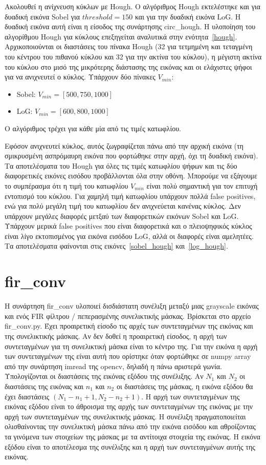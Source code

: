\documentclass{article}
\begin{document}
Ακολουθεί η ανίχνευση κύκλων με Hough. Ο αλγόριθμος Hough εκτελέστηκε και για
δυαδική εικόνα Sobel για $threshold = 150$ και για την δυαδική εικόνα LoG. 
Η δυαδική εικόνα αυτή είναι η είσοδος της συνάρτησης circ\_hough. 
Η υλοποίηση του αλγορίθμου Hough για κύκλους επεξηγείται αναλυτικά στην 
ενότητα~\ref{hough}. 
Αρχικοποιούνται οι διαστάσεις του πίνακα Hough (32 για τετμημένη και τεταγμένη
του κέντρου του πιθανού κύκλου και 32 για την ακτίνα του κύκλου), η μέγιστη 
ακτίνα του κύκλου στο μισό της μικρότερης διάστασης της εικόνας και οι ελάχιστες
ψήφοι για να ανιχνευτεί ο κύκλος. Υπάρχουν δύο πίνακες $V_{min}$:
\begin{itemize}
    \item Sobel: $V_{min} = \left[500, 750, 1000\right]$
    \item LoG: $V_{min} = \left[600, 800, 1000\right]$
\end{itemize}
Ο αλγόριθμος τρέχει για κάθε μία από τις τιμές κατωφλίου.

Εφόσον ανιχνευτεί κύκλος, αυτός ζωγραφίζεται πάνω από την αρχική εικόνα 
(τη σμικρυσμένη ασπρόμαυρη εικόνα που φορτώθηκε στην αρχή, όχι τη δυαδική εικόνα). 
Τα αποτελέσματα του Hough για όλες τις τιμές κατωφλίου ψήφων και τις δύο διαφορετικές
εικόνες εισόδου προβάλλονται όλα στην οθόνη. Μπορούμε να εξάγουμε
το συμπέρασμα ότι η τιμή του κατωφλίου $V_{min}$ είναι πολύ σημαντική για τον
επιτυχή εντοπισμό του κύκλου. Για χαμηλή τιμή κατωφλίου υπάρχουν πολλά false positives,
ενώ για πολύ μεγάλη τιμή του κατωφλίου δεν ανιχνεύεται κανένας κύκλος. Δεν υπάρχουν
μεγάλες διαφορές μετξαύ των διαφορετικών εικόνων Sobel και LoG. Υπάρχουν μερικά
false positives που είναι διαφορετικά και ο πλειοψηφικός κύκλος είναι λίγο εκτοπισμένος
για εικόνα εισόδου LoG, αλλά οι διαφορές είναι αμελητέες. Τα αποτελέσματα φαίνονται στις
εικόνες~\ref{sobel_hough} και~\ref{log_hough}.

\section{fir\_conv}
Η συνάρτηση fir\_conv υλοποιεί δισδιάστατη συνέλιξη μεταξύ μιας grayscale
εικόνας και ενός FIR φίλτρου / πεπερασμένης συνελικτικής μάσκας. Βρίσκεται στο 
αρχείο fir\_conv.py. Έχει προαιρετική είσοδο τις αρχές των συντεταγμένων 
της εικόνας και της συνελικτικής μάσκας. Αν δεν δοθεί η προαιρετική είσοδος, η αρχή 
των συντεταγμένων για τη συνελικτική μάσκα είναι το κέντρο της. Για την εικόνα
η αρχή των συντεταγμένων της είναι αυτή που ορίστηκε όταν φορτώθηκε σε numpy 
array από την συνάρτηση imread της opencv, δηλαδή η πάνω αριστερά γωνία.
Υπολογίζονται οι διαστάσεις της εικόνας εξόδου της συνέλιξης.
Αν $N_1$ και $N_2$ οι διαστάσεις της εικόνας και $n_1$ και $n_2$ οι διαστάσεις
της μάσκας, η εικόνα εξόδου θα έχει διαστάσεις $(N_1 - n_1 + 1, N_2 - n_2 + 1)$.
Η αρχή των συντεταγμένων της εικόνας εξόδου είναι το άθροισμα της αρχής των συντεταγμένων της 
εικόνας με την αρχή των συντεταγμένων της συνελικτικής μάσκας. Η συνέλιξη 
πραγματοποιείται ολισθαίνοντας την συνελικτική μάσκα πάνω από την εικόνα εισόδου
και αθροίζοντας τα γινόμενα των στοιχείων της μάσκας με τα αντίτοιχα στοιχεία 
της εικόνας. Η εικόνα εξόδου είναι το αποτέλεσμα της συνέλιξης και η αρχή των 
συντεταγμένων αυτής της εικόνας.
\end{document}
